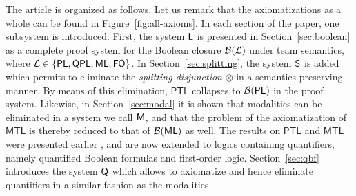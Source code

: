 \documentclass[a4paper,english,fleqn,11pt,final]{scrartcl}
\newcommand{\logic}[1]{\ensuremath{\mathsf{#1}}\xspace}
\newcommand{\PL}{\logic{PL}}
\newcommand{\QPL}{\logic{QPL}}
\newcommand{\ML}{\logic{ML}}
\newcommand{\FO}{\logic{FO}}
\newcommand{\PTL}{\logic{PTL}}
\newcommand{\MTL}{\logic{MTL}}
\newcommand{\calB}{\protect\ensuremath{\mathcal{B}}}
\newcommand{\calL}{\protect\ensuremath{\mathcal{L}}}
\newcommand{\sfS}{\protect\ensuremath{\mathsf{S}}}
\newcommand{\sfL}{\protect\ensuremath{\mathsf{L}}}
\newcommand{\sfM}{\protect\ensuremath{\mathsf{M}}}
\newcommand{\sfQ}{\protect\ensuremath{\mathsf{Q}}}
\newcommand{\tens}{\otimes}
\theoremstyle{plain}
\theoremstyle{definition}
\begin{document}
\smallskip

The article is organized as follows.
Let us remark that the axiomatizations as a whole can be found in Figure~\ref{fig:all-axioms}.
In each section of the paper, one subsystem is introduced.
First, the system $\sfL$ is presented in Section~\ref{sec:boolean} as a complete proof system for the Boolean closure $\calB(\calL)$ under team semantics, where $\calL\in \{\PL,\QPL,\ML,\FO\}$.
In Section~\ref{sec:splitting}, the system $\sfS$ is added which permits to eliminate the \emph{splitting disjunction} $\tens$ in a semantics-preserving manner.
By means of this elimination, $\PTL$ collapses to $\calB(\PL)$ in the proof system.
Likewise, in Section~\ref{sec:modal} it is shown that modalities can be eliminated in a system we call $\sfM$, and that the problem of the axiomatization of $\MTL$ is thereby reduced to that of $\calB(\ML)$ as well.
The results on $\PTL$ and $\MTL$ were presented earlier \cite{csl16axiom}, and are now extended to logics containing quantifiers, namely quantified Boolean formulas and first-order logic.
Section~\ref{sec:qbf} introduces the system $\sfQ$ which allows to axiomatize and hence eliminate quantifiers in a similar fashion as the modalities.
\end{document}

